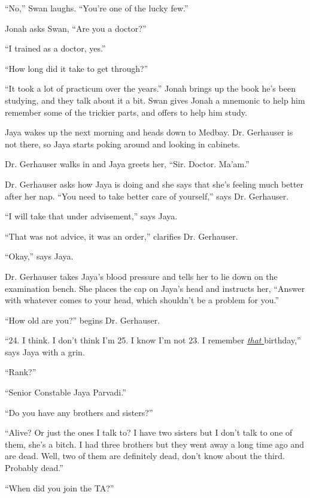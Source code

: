 ``No,'' Swan laughs. ``You're one of the lucky few.''

Jonah asks Swan, ``Are you a doctor?''

``I trained as a doctor, yes.''

``How long did it take to get through?''

``It took a lot of practicum over the years.'' Jonah brings up the book he's been studying, and they talk about it a bit.  Swan gives Jonah a mnemonic to help him remember some of the trickier parts, and offers to help him study.



Jaya wakes up the next morning and heads down to Medbay.  Dr. Gerhauser is not there, so Jaya starts poking around and looking in cabinets.



Dr. Gerhauser walks in and Jaya greets her, ``Sir. Doctor.  Ma'am.''

Dr. Gerhauser asks how Jaya is doing and she says that she's feeling much better after her nap.  ``You need to take better care of yourself,'' says Dr. Gerhauser.

``I will take that under advisement,'' says Jaya.

``That was not advice, it was an order,'' clarifies Dr. Gerhauser.

``Okay,'' says Jaya.



Dr. Gerhauser takes Jaya's blood pressure and tells her to lie down on the examination bench.  She places the cap on Jaya's head and instructs her, ``Answer with whatever comes to your head, which shouldn't be a problem for you.''

``How old are you?'' begins Dr. Gerhauser.

``24.  I think.  I don't think I'm 25.  I know I'm not 23. I remember \underline{ \textit{that } }birthday,'' says Jaya with a grin.

``Rank?''

``Senior Constable Jaya Parvadi.''

``Do you have any brothers and sisters?''

``Alive?  Or just the ones I talk to?  I have two sisters but I don't talk to one of them, she's a bitch.  I had three brothers but they went away a long time ago and are dead.  Well, two of them are definitely dead, don't know about the third. Probably dead.''

``When did you join the TA?''

